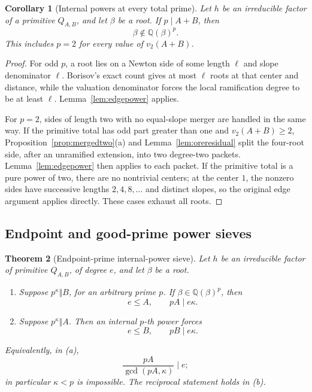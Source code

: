 \documentclass[11pt]{article}
\newtheorem{theorem}{Theorem}[section]
\newtheorem{corollary}[theorem]{Corollary}
\theoremstyle{definition}
\newcommand{\Q}{\mathbb Q}
\begin{document}
\begin{corollary}[Internal powers at every total prime]
\label{cor:totalprimepower}
Let \(h\) be an irreducible factor of a primitive \(Q_{A,B}\), and let
\(\beta\) be a root.  If \(p\mid A+B\), then
\[
 \beta\notin\Q(\beta)^p.
\]
This includes \(p=2\) for every value of \(v_2(A+B)\).
\end{corollary}

\begin{proof}
For odd \(p\), a root lies on a Newton side of some length \(\ell\) and
slope denominator \(\ell\).  Borisov's exact count gives at most \(\ell\)
roots at that center and distance, while the valuation denominator forces
the local ramification degree to be at least \(\ell\).
Lemma~\ref{lem:edgepower} applies.

For \(p=2\), sides of length two with no equal-slope merger are handled in
the same way.  If the primitive total has odd part greater than one and
\(v_2(A+B)\geq2\), Proposition~\ref{prop:mergedtwo}(a) and
Lemma~\ref{lem:oreresidual} split the four-root side, after an unramified
extension, into two degree-two packets.  Lemma~\ref{lem:edgepower} then
applies to each packet.  If the primitive total is a pure power of two,
there are no nontrivial centers; at the center \(1\), the nonzero sides have
successive lengths \(2,4,8,\ldots\) and distinct slopes, so the original
edge argument applies directly.  These cases exhaust all roots.
\end{proof}

\subsection{Endpoint and good-prime power sieves}

\begin{theorem}[Endpoint-prime internal-power sieve]
\label{thm:endpointpower}
Let \(h\) be an irreducible factor of primitive \(Q_{A,B}\), of degree
\(e\), and let \(\beta\) be a root.
\begin{enumerate}[label=(\alph*)]
\item Suppose \(p^\kappa\Vert B\), for an arbitrary prime \(p\).  If
\(\beta\in\Q(\beta)^p\), then
\begin{equation}
 e\leq A,\qquad pA\mid e\kappa.
 \tag{15.5}
\end{equation}
\item Suppose \(p^\kappa\Vert A\).  Then an internal \(p\)-th power
forces
\begin{equation}
 e\leq B,\qquad pB\mid e\kappa.
 \tag{15.6}
\end{equation}
\end{enumerate}
Equivalently, in (a),
\[
 \frac{pA}{\gcd(pA,\kappa)}\mid e;
\]
in particular \(\kappa<p\) is impossible.  The reciprocal statement holds
in (b).
\end{theorem}
\end{document}
